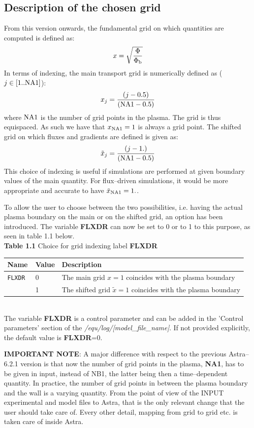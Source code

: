 \subsection{Description of the chosen grid}
From this version onwards, the fundamental grid on which quantities are computed is defined as:
\begin{eqnarray}
x = \sqrt{\frac{\Phi}{\Phi_{\rm b}}}
\label{normgridfeeq}
\end{eqnarray}
In terms of indexing, the main transport grid is numerically defined as ($j  \in [1..{\rm NA1}]$):
\begin{eqnarray}
x_j = \frac{(j-0.5)}{({\rm NA1}-0.5)}
\label{normgridindexeq}
\end{eqnarray}
where ${\rm  NA1}$ is the number of grid points in the plasma. The grid is thus equispaced.
As such we have that $x_{\rm NA1}=1$ is always a grid point. 
The shifted grid on which fluxes and gradients are defined is given as:
\begin{eqnarray}
\tilde{x}_j = \frac{(j-1.)}{({\rm NA1}-0.5)}
\label{snormgridindexeq}
\end{eqnarray}
This choice of indexing is useful if simulations are performed at given boundary
values of the main quantity. For flux--driven simulations, it would be more
appropriate and accurate to have $\tilde{x}_{\rm  NA1}=1.$. 

To allow the user to choose between the two possibilities, i.e. having the 
actual plasma boundary on the main or on the shifted grid, an option has been 
introduced. The variable {\bf FLXDR} can now be set to 0 or to 1 to this purpose, as seen in table 1.1 below. 
\\
{\bf Table 1.1} Choice for grid indexing label {\bf FLXDR}\\[2ex]
\begin{tabular}{|l|l|l|}					\hline
\bf Name	&\bf Value & Description\\ \hline
\tt FLXDR 	& 0 & The main grid $x=1$ coincides with the plasma boundary\\
\tt  	& 1 &  The shifted grid $\tilde{x}=1$ coincides with the plasma boundary\\ 
\hline
\end{tabular}
\bigskip\\
The variable {\bf FLXDR} is a control parameter and can be added in the 'Control parameters' section of the {\it /equ/log/[model\_file\_name]}.
If not provided explicitly, the default value is {\bf FLXDR}=0.

{\bf IMPORTANT NOTE}: A major difference with respect to the previous Astra--6.2.1 version is that now
the number of grid points in the plasma, {\bf NA1}, has to be given in input,
instead of {\rm NB1}, the latter being then a time--dependent quantity. In 
practice, the number of grid points in between the plasma boundary and the wall 
is a varying quantity.
From the point of view of the INPUT experimental and model files to Astra, that 
is the only relevant change that the user should take care of. Every other 
detail, mapping from grid to grid etc. is taken care of inside Astra. 


